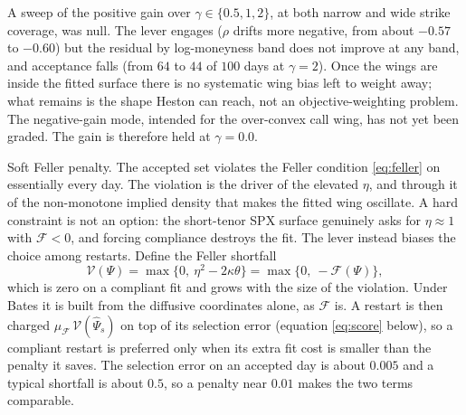 \documentclass[a4paper, 11pt, reqno]{amsart}
\makeatletter
\def\paragraph{\@startsection{paragraph}{4}%
	\z@\z@{-\fontdimen2\font}%
	{\normalfont\bfseries}}
\newcommand{\ConstWingGainSym}{\gamma}                   \newcommand{\ConstWingGainVal}{0.0}
\newcommand{\ConstFellerPenaltySym}{\mu_{\mathcal{F}}}   \newcommand{\ConstFellerPenaltyVal}{0.0}
\makeatother
\begin{document}
		A sweep of the positive gain over $\ConstWingGainSym\in\{0.5,1,2\}$, at both narrow and wide strike
		coverage, was null. The lever engages ($\rho$ drifts more negative, from about $-0.57$ to $-0.60$)
		but the residual by log-moneyness band does not improve at any band, and acceptance falls (from
		$64$ to $44$ of $100$ days at $\ConstWingGainSym=2$). Once the wings are inside the fitted surface
		there is no systematic wing bias left to weight away; what remains is the shape Heston can reach,
		not an objective-weighting problem. The negative-gain mode, intended for the over-convex call wing,
		has not yet been graded. The gain is therefore held at $\ConstWingGainSym=\ConstWingGainVal$.

		\paragraph{Soft Feller penalty.} The accepted set violates the Feller condition
		\eqref{eq:feller} on essentially every day. The violation is the driver of the elevated $\eta$,
		and through it of the non-monotone implied density that makes the fitted wing oscillate. A hard
		constraint is not an option: the short-tenor SPX surface genuinely asks for $\eta\approx1$ with
		$\mathcal{F}<0$, and forcing compliance destroys the fit. The lever instead biases the choice
		among restarts. Define the Feller shortfall
		\begin{equation}\label{eq:feller-viol}
			\mathcal{V}(\Psi) = \max\bigl\{0,\ \eta^2 - 2\kappa\theta\bigr\} = \max\bigl\{0,\ -\mathcal{F}(\Psi)\bigr\},
		\end{equation}
		which is zero on a compliant fit and grows with the size of the violation. Under Bates it is built
		from the diffusive coordinates alone, as $\mathcal{F}$ is. A restart is then charged
		$\ConstFellerPenaltySym\,\mathcal{V}(\widehat\Psi_s)$ on top of its selection error (equation
		\eqref{eq:score} below), so a compliant restart is preferred only when its extra fit cost is
		smaller than the penalty it saves. The selection error on an accepted day is about $0.005$ and a
		typical shortfall is about $0.5$, so a penalty near $0.01$ makes the two terms comparable.
\end{document}
